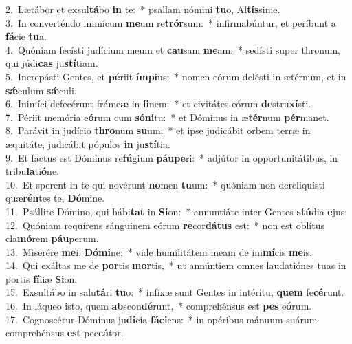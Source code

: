 {2.~}Lætábor et exsul\textbf{tá}bo \textbf{in} te:~* psallam nómini \textbf{tu}o, Al\textbf{tís}sime.\\
{3.~}In converténdo inimícum \textbf{me}um re\textbf{trór}sum:~* infirmabúntur, et períbunt a \textbf{fá}cie \textbf{tu}a.\\
{4.~}Quóniam fecísti judícium meum et \textbf{cau}sam \textbf{me}am:~* sedísti super thronum, qui júdi\textbf{cas} ju\textbf{stí}tiam.\\
{5.~}Increpásti Gentes, et \textbf{pé}riit \textbf{ím}\textbf{pi}us:~* nomen eórum delésti in ætérnum, et in \textbf{sǽ}culum \textbf{sǽ}culi.\\
{6.~}Inimíci defecérunt fráme\textbf{æ} in \textbf{fi}nem:~* et civitátes eórum \textbf{de}stru\textbf{xí}sti.\\
{7.~}Périit memória e\textbf{ó}rum cum \textbf{só}\textbf{ni}tu:~* et Dóminus in æ\textbf{tér}num \textbf{pér}manet.\\
{8.~}Parávit in judício \textbf{thro}num \textbf{su}um:~* et ipse judicábit orbem terræ in æquitáte, judicábit pópulos \textbf{in} ju\textbf{stí}tia.\\
{9.~}Et factus est Dóminus re\textbf{fú}gium \textbf{páu}\textbf{pe}ri:~* adjútor in opportunitátibus, in tribu\textbf{la}ti\textbf{ó}ne.\\
{10.~}Et sperent in te qui novérunt \textbf{no}men \textbf{tu}um:~* quóniam non dereliquísti quæ\textbf{rén}tes te, \textbf{Dó}mine.\\
{11.~}Psállite Dómino, qui hábi\textbf{tat} in \textbf{Si}on:~* annuntiáte inter Gentes \textbf{stú}dia \textbf{e}jus:\\
{12.~}Quóniam requírens sánguinem eórum \textbf{re}cor\textbf{dá}\textbf{tus} est:~* non est oblítus cla\textbf{mó}rem \textbf{páu}perum.\\
{13.~}Miserére \textbf{me}i, \textbf{Dó}\textbf{mi}ne:~* vide humilitátem meam de ini\textbf{mí}cis \textbf{me}is.\\
{14.~}Qui exáltas me de \textbf{por}tis \textbf{mor}tis,~* ut annúntiem omnes laudatiónes tuas in portis \textbf{fí}liæ \textbf{Si}on.\\
{15.~}Exsultábo in salu\textbf{tá}ri \textbf{tu}o:~* infíxæ sunt Gentes in intéritu, \textbf{quem} fe\textbf{cé}runt.\\
{16.~}In láqueo isto, quem \textbf{ab}scon\textbf{dé}runt,~* comprehénsus est \textbf{pes} e\textbf{ó}rum.\\
{17.~}Cognoscétur Dóminus ju\textbf{dí}cia \textbf{fá}\textbf{ci}ens:~* in opéribus mánuum suárum comprehénsus \textbf{est} pec\textbf{cá}tor.\\

